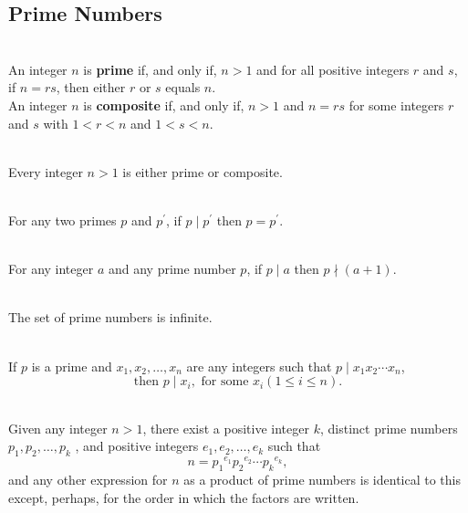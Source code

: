\documentclass[12pt]{article}
\begin{document}
\subsection{Prime Numbers}
\begin{definition}
\hfill\\
\normalfont An integer $n$ is \textbf{prime} if, and only if, $n > 1$ and for all positive integers $r$ and $s$, if
$n = rs$, then either $r$ or $s$ equals $n$. \\
An integer $n$ is \textbf{composite} if, and only if, $n > 1$ and $n = rs$ for some integers $r$ and $s$ with $1 < r < n$ and $1 < s < n$. 
\end{definition}
\begin{proposition}
\hfill\\
\normalfont Every integer $n > 1$ is either prime or composite.
\end{proposition}
\begin{proposition}[4.2.2]
\hfill\\
\normalfont For any two primes $p$ and $p^\prime$, if $p \mid p^\prime$ then $p = p^\prime$.
\end{proposition}
\begin{proposition}[4.7.3(Epp)]
\hfill\\
\normalfont For any integer $a$ and any prime number $p$, if $p \mid a$ then $p \nmid (a + 1)$.
\end{proposition}
\begin{proposition}[4.7.4]
\hfill\\
\normalfont The set of prime numbers is infinite.
\end{proposition}
\begin{theorem}[4.2.3]
\hfill\\
\normalfont If $p$ is a prime and $x_1, x_2,\ldots,x_n$  are any integers such that $p \mid x_1 x_2 \cdots x_n$,
\[\text{then }p \mid x_i,\text{ for some }x_i (1 \leq i \leq n).\]
\end{theorem}
\begin{theorem}[4.3.5(Epp)]
\hfill\\
\normalfont Given any integer $n > 1$, there exist a positive integer $k$, distinct prime numbers $p_1 , p_2 ,\ldots, p_k$ , and positive integers $e_1 , e_2 ,\ldots, e_k$ such that
\[n = {p_1}^{e_1} {p_2}^{e_2} \cdots{p_k}^{e_k},\]
and any other expression for $n$ as a product of prime numbers is identical to this except, perhaps, for the order in which the factors are written.
\end{theorem}
\end{document}
